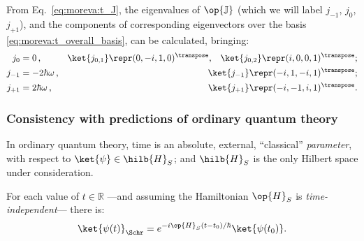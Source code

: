 From Eq.~\eqref{eq:moreva:t_J},
the eigenvalues of $\op{\mathbb{J}}$
(which we will label $j_{-1}$, $j_{0}$, $j_{+1}$),
and the components of corresponding eigenvectors over the basis \eqref{eq:moreva:t_overall_basis},
can be calculated, bringing:
\begin{align}
  j_0     &= 0\,\text{,}              &\ket{j_{0,1}}  \repr (0, -i, 1, 0)^\transpose \text{,}\quad \ket{j_{0,2}} \repr (i, 0, 0 ,1)^\transpose \text{;}
    \label{eq:moreva:eigenJ0} \\
  j_{-1}  &= -2\hbar\omega\,\text{,}  &\ket{j_{-1}}   \repr (-i, 1, -i, 1)^\transpose \text{;} \\
  j_{+1}   &= 2\hbar\omega\,\text{,}  &\ket{j_{+1}}   \repr (-i, -1, i, 1)^\transpose \text{.}
\end{align}



\subsubsection{Consistency with predictions of ordinary quantum theory}
\label{sec:qubit:pw-vs-qm}

In ordinary quantum theory, time is an absolute, external, ``classical'' \emph{parameter},
with respect to $\ket{\psi} \in \hilb{H}_S$; and $\hilb{H}_S$
is the only Hilbert space under consideration.

For each value of $t \in \mathbb{R}$
---and assuming the Hamiltonian $\op{H}_{S}$ is \emph{time-in\-de\-pend\-ent}---
there is:
\begin{equation}\label{eq:ordinary_evolution}
  \ket{\psi(t)}_{\Schr} =
  e^{-i\op{H}_{S}(t-t_0)/\hbar}\ket{\psi(t_0)}
  \text{.}
\end{equation}

